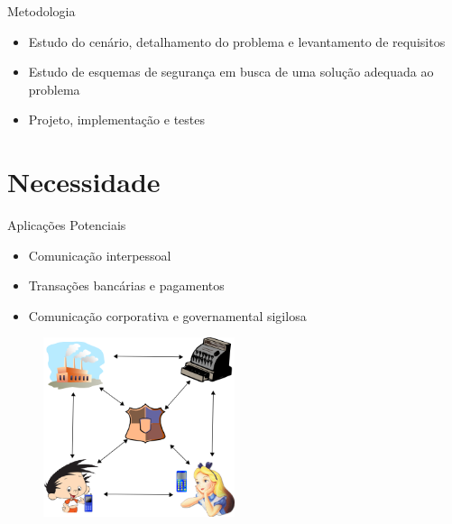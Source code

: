 \documentclass[notes,blue,mathserif]{beamer}
\begin{document}

\begin{frame}{Metodologia}
\begin{itemize}[<+->]
\item Estudo do cen\'{a}rio, detalhamento do problema e levantamento de requisitos
\item Estudo de esquemas de seguran\c{c}a em busca de uma solu\c{c}\~{a}o adequada ao problema
\item Projeto, implementa\c{c}\~{a}o e testes
\end{itemize}
\end{frame}

\section{Necessidade}


\begin{frame}{Aplica\c{c}\~{o}es Potenciais}
\begin{itemize}[<+->]
\item Comunica\c{c}\~{a}o interpessoal
\item Transa\c{c}\~{o}es banc\'{a}rias e pagamentos
\item Comunica\c{c}\~{a}o corporativa e governamental sigilosa
\end{itemize}

\begin{figure}
	\centering
		\includegraphics[width=0.50\textwidth]{figuras/aplicacoes.png}
	\label{fig:aplicacoes}
\end{figure}

\end{frame}
\end{document}
